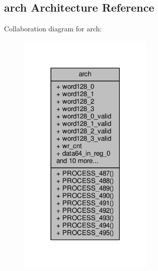 \subsection{arch Architecture Reference}
\label{classunpack__64__to__56_1_1arch}


Collaboration diagram for arch\+:\nopagebreak
\begin{figure}[H]
\begin{center}
\leavevmode
\includegraphics[width=182pt]{d3/d26/classunpack__64__to__56_1_1arch__coll__graph}
\end{center}
\end{figure}
